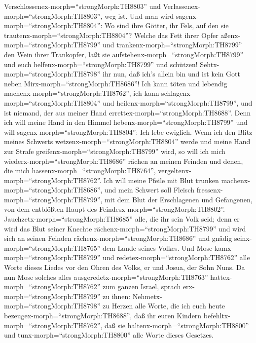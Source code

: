 Verschlossenex-morph=``strongMorph:TH8803'' und
Verlassenex-morph=``strongMorph:TH8803'', weg ist.  Und man
wird sagenx-morph=``strongMorph:TH8804'': Wo sind ihre Götter, ihr Fels,
auf den sie trautenx-morph=``strongMorph:TH8804''?  Welche
das Fett ihrer Opfer aßenx-morph=``strongMorph:TH8799'' und
trankenx-morph=``strongMorph:TH8799'' den Wein ihrer Trankopfer, laßt
sie aufstehenx-morph=``strongMorph:TH8799'' und euch
helfenx-morph=``strongMorph:TH8799'' und schützen! 
Sehtx-morph=``strongMorph:TH8798'' ihr nun, daß ich's allein bin und ist
kein Gott neben Mirx-morph=``strongMorph:TH8686''! Ich kann töten und
lebendig machenx-morph=``strongMorph:TH8762'', ich kann
schlagenx-morph=``strongMorph:TH8804'' und
heilenx-morph=``strongMorph:TH8799'', und ist niemand, der aus meiner
Hand errettex-morph=``strongMorph:TH8688''.  Denn ich will
meine Hand in den Himmel hebenx-morph=``strongMorph:TH8799'' und will
sagenx-morph=``strongMorph:TH8804'': Ich lebe ewiglich. 
Wenn ich den Blitz meines Schwerts wetzenx-morph=``strongMorph:TH8804''
werde und meine Hand zur Strafe greifenx-morph=``strongMorph:TH8799''
wird, so will ich mich wiederx-morph=``strongMorph:TH8686'' rächen an
meinen Feinden und denen, die mich hassenx-morph=``strongMorph:TH8764'',
vergeltenx-morph=``strongMorph:TH8762''.  Ich will meine
Pfeile mit Blut trunken machenx-morph=``strongMorph:TH8686'', und mein
Schwert soll Fleisch fressenx-morph=``strongMorph:TH8799'', mit dem Blut
der Erschlagenen und Gefangenen, von dem entblößten Haupt des
Feindesx-morph=``strongMorph:TH8802''. 
Jauchzetx-morph=``strongMorph:TH8685'' alle, die ihr sein Volk seid;
denn er wird das Blut seiner Knechte
rächenx-morph=``strongMorph:TH8799'' und wird sich an seinen Feinden
rächenx-morph=``strongMorph:TH8686'' und gnädig
seinx-morph=``strongMorph:TH8765'' dem Lande seines Volkes.
 Und Mose kamx-morph=``strongMorph:TH8799'' und
redetex-morph=``strongMorph:TH8762'' alle Worte dieses Liedes vor den
Ohren des Volks, er und Josua, der Sohn Nuns.  Da nun Mose
solches alles ausgeredetx-morph=``strongMorph:TH8763''
hattex-morph=``strongMorph:TH8762'' zum ganzen Israel, 
sprach erx-morph=``strongMorph:TH8799'' zu ihnen:
Nehmetx-morph=``strongMorph:TH8798'' zu Herzen alle Worte, die ich euch
heute bezeugex-morph=``strongMorph:TH8688'', daß ihr euren Kindern
befehltx-morph=``strongMorph:TH8762'', daß sie
haltenx-morph=``strongMorph:TH8800'' und
tunx-morph=``strongMorph:TH8800'' alle Worte dieses Gesetzes.
